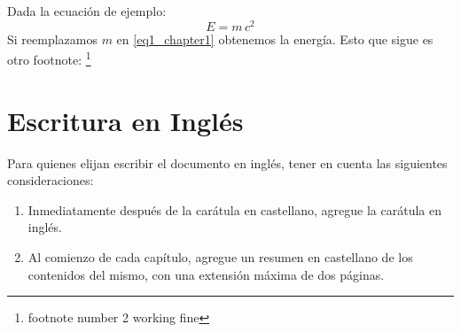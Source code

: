 Dada la ecuación de ejemplo:
\begin{equation}
	\label{eq1_chapter1}
	E=m\,c^2
\end{equation}
Si reemplazamos $m$ en \eqref{eq1_chapter1} obtenemos la energía. Esto que sigue es otro footnote: \footnote{footnote number 2 working fine}

\section{Escritura en Inglés}

Para quienes elijan escribir el documento en inglés, tener en cuenta las siguientes consideraciones: 
\begin{enumerate}
    \item Inmediatamente después de la carátula en castellano, agregue la carátula en inglés. 
    \item Al comienzo de cada capítulo, agregue un resumen en castellano de los contenidos del mismo, con una extensión máxima de dos páginas.
\end{enumerate}



